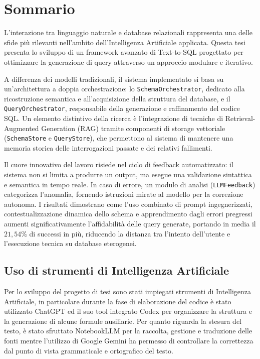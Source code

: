 \chapter*{Sommario} %
\label{sommario}


L'interazione tra linguaggio naturale e database relazionali rappresenta
una delle sfide più rilevanti nell'ambito dell'Intelligenza Artificiale
applicata. Questa tesi presenta lo sviluppo di un framework avanzato di
Text-to-SQL progettato per ottimizzare la generazione di query
attraverso un approccio modulare e iterativo.

A differenza dei modelli tradizionali, il sistema implementato si basa
su un'architettura a doppia orchestrazione: lo
\texttt{SchemaOrchestrator}, dedicato alla ricostruzione semantica e
all'acquisizione della struttura del database, e il
\texttt{QueryOrchestrator}, responsabile della generazione e
raffinamento del codice SQL. Un elemento distintivo della ricerca è
l'integrazione di tecniche di Retrieval-Augmented Generation (RAG)
tramite componenti di storage vettoriale (\texttt{SchemaStore} e
\texttt{QueryStore}), che permettono al sistema di mantenere una memoria
storica delle interrogazioni passate e dei relativi fallimenti.

Il cuore innovativo del lavoro risiede nel ciclo di feedback
automatizzato: il sistema non si limita a produrre un output, ma esegue
una validazione sintattica e semantica in tempo reale. In caso di
errore, un modulo di analisi (\texttt{LLMFeedback}) categorizza
l'anomalia, fornendo istruzioni mirate al modello per la correzione
autonoma. I risultati dimostrano come l'uso combinato
di prompt ingegnerizzati, contestualizzazione dinamica dello schema e
apprendimento dagli errori pregressi aumenti significativamente
l'affidabilità delle query generate, portando in media il \(21,54\%\) di successi in più, riducendo la distanza tra l'intento
dell'utente e l'esecuzione tecnica su database eterogenei.

\section*{Uso di strumenti di Intelligenza Artificiale}

Per lo sviluppo del progetto di tesi sono stati impiegati strumenti di Intelligenza Artificiale,
in particolare durante la fase di elaborazione del codice è stato utilizzato ChatGPT \cite{chatgpt} ed il suo tool integrato
Codex \cite{openai_codex} per organizzare la struttura e la generazione di alcune formule ausiliarie. 
Per quanto riguarda la stesura del testo, è stato sfruttato NotebookLLM \cite{google_notebooklm} per la raccolta, gestione e traduzione delle fonti
mentre l'utilizzo di Google Gemini \cite{google_gemini} ha permesso di controllare la correttezza dal punto di vista grammaticale e ortografico del testo.
